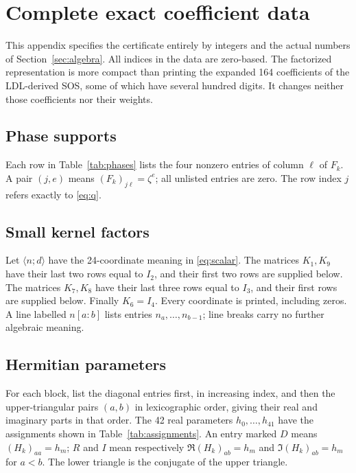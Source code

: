 \documentclass[11pt,a4paper]{article}
\numberwithin{equation}{section}
\theoremstyle{remark}\newtheorem{remark}[theorem]{Remark}
\begin{document}



\clearpage
\appendix
\section{Complete exact coefficient data}\label{app:data}
This appendix specifies the certificate entirely by integers and the actual
numbers of Section~\ref{sec:algebra}. All indices in the data are zero-based.
The factorized representation is more compact than printing the expanded
164 coefficients of the LDL-derived SOS, some of which have several hundred
digits. It changes neither those coefficients nor their weights.

\subsection{Phase supports}
Each row in Table~\ref{tab:phases} lists the four nonzero entries of column
$\ell$ of $F_k$. A pair $(j,e)$ means $(F_k)_{j\ell}=\zeta^e$; all unlisted
entries are zero. The row index $j$ refers exactly to \eqref{eq:q}.


\subsection{Small kernel factors}
Let $\langle n;d\rangle$ have the 24-coordinate meaning in
\eqref{eq:scalar}. The matrices $K_1,K_9$ have their last two rows equal
to $I_2$, and their first two rows are supplied below. The matrices
$K_7,K_8$ have their last three rows equal to $I_3$, and their first rows
are supplied below. Finally $K_6=I_4$. Every coordinate is printed, including
zeros. A line labelled $n[a{:}b]$ lists entries $n_a,\ldots,n_{b-1}$;
line breaks carry no further algebraic meaning.


\subsection{Hermitian parameters}
For each block, list the diagonal entries first, in increasing index, and
then the upper-triangular pairs $(a,b)$ in lexicographic order, giving
their real and imaginary parts in that order. The 42 real parameters
$h_0,\ldots,h_{41}$ have the assignments shown in Table~\ref{tab:assignments}.
An entry marked $D$ means $(H_k)_{aa}=h_m$; $R$ and $I$ mean respectively
$\Re(H_k)_{ab}=h_m$ and $\Im(H_k)_{ab}=h_m$ for $a<b$.
The lower triangle is the conjugate of the upper triangle.

\end{document}
